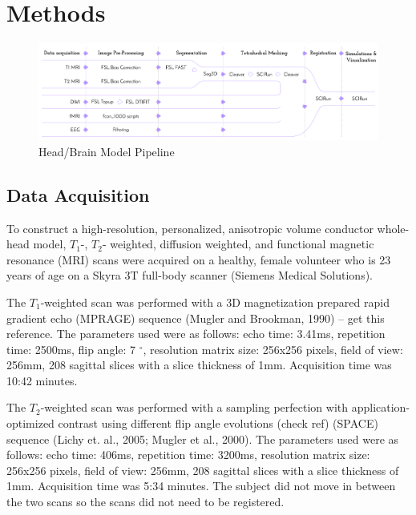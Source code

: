 
\section{Methods}
\label{sec:Methods}

\begin{figure}[H]
    \centering
    \includegraphics[width=\textwidth]{Figures/pipeline}
    \caption{Head/Brain Model Pipeline}
    \label{fig:pipeline}
\end{figure}

\subsection{Data Acquisition}
\label{sec:Data}


To construct a high-resolution, personalized, anisotropic volume conductor whole-head model, $T_1$-, $T_2$- weighted, diffusion weighted, and functional magnetic resonance (MRI) scans were acquired on a healthy, female volunteer who is 23 years of age on a Skyra 3T full-body scanner (Siemens Medical Solutions). 

The $T_1$-weighted scan was performed with a 3D magnetization prepared rapid gradient echo (MPRAGE) sequence (Mugler and Brookman, 1990) -- get this reference. The parameters used were as follows: echo time: 3.41ms, repetition time: 2500ms, flip angle: 7 $^{\circ}$, resolution matrix size: 256x256 pixels, field of view: 256mm, 208 sagittal slices with a slice thickness of 1mm. Acquisition time was 10:42 minutes. 

The $T_2$-weighted scan was performed with a sampling perfection with application-optimized contrast using different flip angle evolutions (check ref) (SPACE) sequence (Lichy et. al., 2005; Mugler et al., 2000). The parameters used were as follows: echo time: 406ms, repetition time: 3200ms, resolution matrix size: 256x256 pixels, field of view: 256mm, 208 sagittal slices with a slice thickness of 1mm. Acquisition time was 5:34 minutes. The subject did not move in between the two scans so the scans did not need to be registered. 

